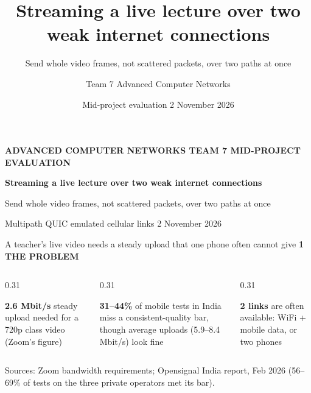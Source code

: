 \documentclass[aspectratio=169,11pt]{beamer}
\title{Streaming a live lecture over two weak internet connections}
\subtitle{Send whole video frames, not scattered packets, over two paths at once}
\author{Team 7 \textperiodcentered{} Advanced Computer Networks}
\date{Mid-project evaluation \textperiodcentered{} 2 November 2026}
\newcommand{\eyebrow}[1]{{\color{accent}\footnotesize\bfseries\MakeUppercase{#1}}\par\smallskip}
\newcommand{\bignum}[2]{{\color{#1}\Huge\bfseries #2}}
\begin{document}
{
\begin{frame}[plain]
  \vfill
  {\color{accent}\footnotesize\bfseries ADVANCED COMPUTER NETWORKS \textperiodcentered{} TEAM 7 \textperiodcentered{} MID-PROJECT EVALUATION}\par\bigskip
  {\color{paper}\huge\bfseries Streaming a live lecture over two weak internet connections\par}\bigskip
  {\color{mist}\large Send whole video frames, not scattered packets, over two paths at once\par}
  \vfill
  {\color{mist}\footnotesize Multipath QUIC \textperiodcentered{} emulated cellular links \textperiodcentered{} 2 November 2026}
\end{frame}}

\begin{frame}{A teacher's live video needs a steady upload that one phone often cannot give}
  \eyebrow{1 \textperiodcentered{} The problem}
  \begin{columns}[T]
    \begin{column}{0.31\textwidth}
      \begin{block}{\bignum{blue}{2.6 Mbit/s}}
        steady upload needed for a 720p class video (Zoom's figure)
      \end{block}
    \end{column}
    \begin{column}{0.31\textwidth}
      \begin{block}{\bignum{accent}{31--44\%}}
        of mobile tests in India miss a consistent-quality bar, though average uploads (5.9--8.4 Mbit/s) look fine
      \end{block}
    \end{column}
    \begin{column}{0.31\textwidth}
      \begin{block}{\bignum{navy}{2 links}}
        are often available: WiFi + mobile data, or two phones
      \end{block}
    \end{column}
  \end{columns}
  \vfill
  {\scriptsize Sources: Zoom bandwidth requirements; Opensignal India report, Feb 2026 (56--69\% of tests on the three private operators met its bar).}
\end{frame}
\end{document}
